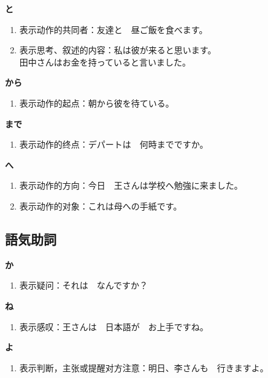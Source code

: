 {\bf
\noindent と
}

\begin{enumerate}
  \item 表示动作的共同者：友達と　昼ご飯を食べます。
  \item 表示思考、叙述的内容：私は彼が来ると思います。\\
    田中さんはお金を持っていると言いました。
\end{enumerate}

{\bf
\noindent から
}

\begin{enumerate}
  \item 表示动作的起点：朝から彼を待ている。
\end{enumerate}

{\bf
\noindent まで
}

\begin{enumerate}
  \item 表示动作的终点：デパートは　何時までですか。
\end{enumerate}

{\bf
\noindent へ
}

\begin{enumerate}
  \item 表示动作的方向：今日　王さんは学校へ勉強に来ました。
  \item 表示动作的对象：これは母への手紙です。
\end{enumerate}



\subsection{語気助詞}%

{\bf
\noindent か
}

\begin{enumerate}
  \item 表示疑问：それは　なんですか？
\end{enumerate}

{\bf
\noindent ね
}

\begin{enumerate}
  \item 表示感叹：王さんは　日本語が　お上手ですね。
\end{enumerate}

{\bf
\noindent よ
}

\begin{enumerate}
  \item 表示判断，主张或提醒对方注意：明日、李さんも　行きますよ。
\end{enumerate}



